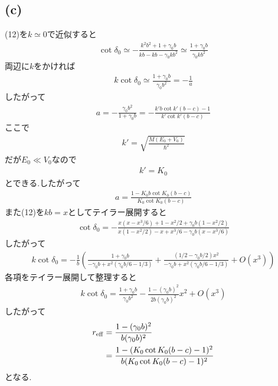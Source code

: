 \documentclass[uplatex,a4j,11pt,dvipdfmx]{jsarticle}
\begin{document}
\subsection*{(c)}
(12)を$k\simeq 0$で近似すると
\begin{align*}
  \cot\delta_0\simeq-\frac{k^2b^2+1+\gamma_0b}{kb-kb-\gamma_0kb^2}\simeq\frac{1+\gamma_0b}{\gamma_0kb^2}
\end{align*}
両辺に$k$をかければ
\begin{align*}
  k\cot\delta_0\simeq\frac{1+\gamma_0b}{\gamma_0b^2}=-\frac{1}{a}
\end{align*}
したがって
\begin{align*}
  a=-\frac{\gamma_0b^2}{1+\gamma_0b}=-\frac{k'b\cot k'(b-c)-1}{k'\cot k'(b-c)}
\end{align*}
ここで
\begin{align*}
  k'=\sqrt{\frac{M(E_0+V_0)}{\hbar^2}}
\end{align*}
だが$E_0\ll V_0$なので
\begin{align*}
  k'=K_0
\end{align*}
とできる.したがって
\begin{align}
  a=\frac{1-K_0b\cot K_0(b-c)}{K_0\cot K_0(b-c)}
\end{align}
また(12)を$kb=x$としてテイラー展開すると
\begin{align}
  \cot\delta_0=-\frac{x(x-x^3/6)+1-x^2/2+\gamma_0b(1-x^2/2)}{x(1-x^2/2)-x+x^3/6-\gamma_0b(x-x^3/6)}
\end{align}
したがって
\begin{align*}
  k\cot\delta_0=-\frac{1}{b}\left(\frac{1+\gamma_0b}{-\gamma_0b+x^2(\gamma_0b/6-1/3)}
  +\frac{(1/2-\gamma_0b/2)x^2}{-\gamma_0b+x^2(\gamma_0b/6-1/3)}+O(x^3)
  \right)
\end{align*}
各項をテイラー展開して整理すると
\begin{align*}
  k\cot\delta_0=\frac{1+\gamma_0b}{\gamma_0b^2}-\frac{1-(\gamma_0b)^2}{2b(\gamma_0b)^2}x^2+O(x^3)
\end{align*}
したがって
\begin{align}
  \begin{split}
    r_{\rm eff}&=\frac{1-(\gamma_0b)^2}{b(\gamma_0b)^2}\\
    &=\frac{1-(K_0\cot K_0(b-c)-1)^2}{b(K_0\cot K_0(b-c)-1)^2}
  \end{split}
\end{align}
となる.
\end{document}
